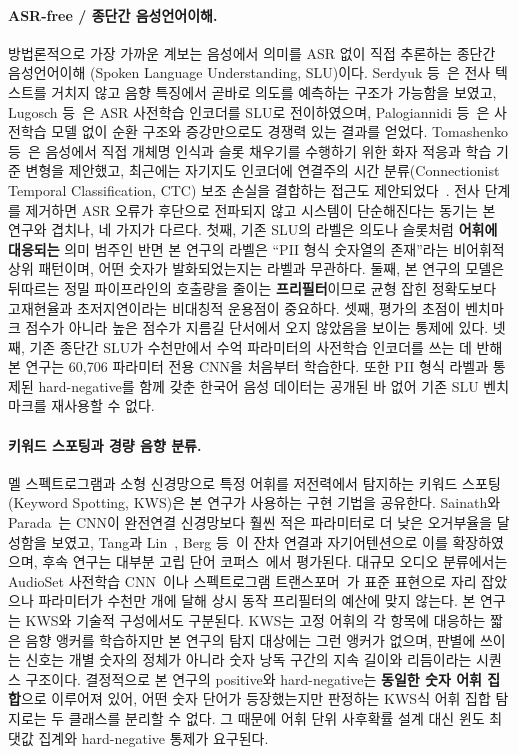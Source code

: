 \documentclass[10pt,twocolumn]{article}
\renewcommand{\emph}[1]{\textbf{#1}}
\begin{document}
\paragraph{ASR-free / 종단간 음성언어이해.}
방법론적으로 가장 가까운 계보는 음성에서 의미를 ASR 없이 직접 추론하는 종단간 음성언어이해
(Spoken Language Understanding, SLU)이다. Serdyuk 등~\cite{serdyuk2018towards}은 전사
텍스트를 거치지 않고 음향 특징에서 곧바로 의도를 예측하는 구조가 가능함을 보였고, Lugosch
등~\cite{lugosch2019pretrain}은 ASR 사전학습 인코더를 SLU로 전이하였으며, Palogiannidi
등~\cite{palogiannidi2020asrfree}은 사전학습 모델 없이 순환 구조와 증강만으로도 경쟁력 있는
결과를 얻었다. Tomashenko 등~\cite{tomashenko2019recent}은 음성에서 직접 개체명 인식과 슬롯
채우기를 수행하기 위한 화자 적응과 학습 기준 변형을 제안했고, 최근에는 자기지도 인코더에
연결주의 시간 분류(Connectionist Temporal Classification, CTC) 보조 손실을 결합하는 접근도
제안되었다~\cite{wang2023jointctc}. 전사 단계를 제거하면 ASR 오류가 후단으로 전파되지 않고
시스템이 단순해진다는 동기는 본 연구와 겹치나, 네 가지가 다르다. 첫째, 기존 SLU의 라벨은
의도나 슬롯처럼 \emph{어휘에 대응되는} 의미 범주인 반면 본 연구의 라벨은 ``PII 형식 숫자열의
존재''라는 비어휘적 상위 패턴이며, 어떤 숫자가 발화되었는지는 라벨과 무관하다. 둘째, 본
연구의 모델은 뒤따르는 정밀 파이프라인의 호출량을 줄이는 \emph{프리필터}이므로 균형 잡힌
정확도보다 고재현율과 초저지연이라는 비대칭적 운용점이 중요하다. 셋째, 평가의 초점이 벤치마크
점수가 아니라 높은 점수가 지름길 단서에서 오지 않았음을 보이는 통제에 있다. 넷째, 기존
종단간 SLU가 수천만에서 수억 파라미터의 사전학습 인코더를 쓰는 데 반해 본 연구는 60{,}706
파라미터 전용 CNN을 처음부터 학습한다. 또한 PII 형식 라벨과 통제된 hard-negative를 함께 갖춘
한국어 음성 데이터는 공개된 바 없어 기존 SLU 벤치마크를 재사용할 수 없다.

\paragraph{키워드 스포팅과 경량 음향 분류.}
멜 스펙트로그램과 소형 신경망으로 특정 어휘를 저전력에서 탐지하는 키워드 스포팅(Keyword
Spotting, KWS)은 본 연구가 사용하는 구현 기법을 공유한다. Sainath와
Parada~\cite{sainath2015cnnkws}는 CNN이 완전연결 신경망보다 훨씬 적은 파라미터로 더 낮은
오거부율을 달성함을 보였고, Tang과 Lin~\cite{tang2018resnetkws}, Berg
등~\cite{berg2021keyword}이 잔차 연결과 자기어텐션으로 이를 확장하였으며, 후속 연구는 대부분
고립 단어 코퍼스~\cite{warden2018speech}에서 평가된다. 대규모 오디오 분류에서는 AudioSet
사전학습 CNN~\cite{kong2020panns}이나 스펙트로그램 트랜스포머~\cite{gong2021ast}가 표준
표현으로 자리 잡았으나 파라미터가 수천만 개에 달해 상시 동작 프리필터의 예산에 맞지 않는다.
본 연구는 KWS와 기술적 구성에서도 구분된다. KWS는 고정 어휘의 각 항목에 대응하는 짧은 음향
앵커를 학습하지만 본 연구의 탐지 대상에는 그런 앵커가 없으며, 판별에 쓰이는 신호는 개별
숫자의 정체가 아니라 숫자 낭독 구간의 지속 길이와 리듬이라는 시퀀스 구조이다. 결정적으로 본
연구의 positive와 hard-negative는 \emph{동일한 숫자 어휘 집합}으로 이루어져 있어, 어떤 숫자
단어가 등장했는지만 판정하는 KWS식 어휘 집합 탐지로는 두 클래스를 분리할 수 없다. 그 때문에
어휘 단위 사후확률 설계 대신 윈도 최댓값 집계와 hard-negative 통제가 요구된다.
\end{document}
